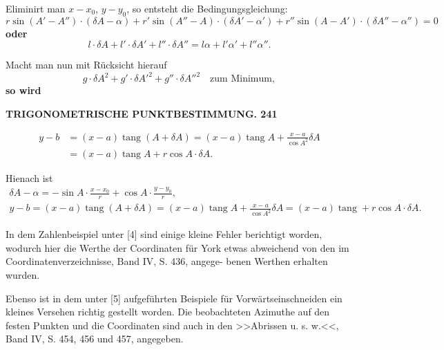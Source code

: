 \documentclass[12pt,a4paper]{article}
\theoremstyle{plain}
\theoremstyle{definition}
\theoremstyle{remark}
\DeclareMathOperator{\tang}{tang}
\begin{document}
Eliminirt man $x - x_0$, $y - y_0$, so entsteht die Bedingungsgleichung:
\[
r\sin(A' - A'') \cdot (\delta A - \alpha) + r'\sin(A'' - A) \cdot (\delta A' - \alpha') + r''\sin(A - A') \cdot (\delta A'' - \alpha'') = 0
\]
\textbf{oder}
\[
l \cdot \delta A + l' \cdot \delta A' + l'' \cdot \delta A'' = l\alpha + l'\alpha' + l''\alpha''.
\]

Macht man nun mit R\"ucksicht hierauf
\[
g \cdot \delta A^2 + g' \cdot \delta A'^2 + g'' \cdot \delta A''^2 \quad \text{zum Minimum},
\]
\textbf{so wird}


\newpage

\noindent\textbf{TRIGONOMETRISCHE PUNKTBESTIMMUNG. 241}

\begin{align*}
y - b &= (x - a)\tang(A + \delta A) = (x - a)\tang A + \frac{x - a}{\cos A^2}\delta A \\
&= (x - a)\tang A + r\cos A \cdot \delta A.
\end{align*}

Hienach ist
\begin{gather*}
\delta A - \alpha = -\sin A \cdot \frac{x - x_0}{r} + \cos A \cdot \frac{y - y_0}{r},\\
y - b = (x - a)\tang(A + \delta A) = (x - a)\tang A + \frac{x - a}{\cos A^2}\delta A = (x - a)\tang + r\cos A \cdot \delta A.
\end{gather*}

In dem Zahlenbeispiel unter [4] sind einige kleine Fehler berichtigt worden, wodurch hier die Werthe
der Coordinaten f\"ur York etwas abweichend von den im Coordinatenverzeichnisse, Band IV, S. 436, angege-
benen Werthen erhalten wurden.

Ebenso ist in dem unter [5] aufgef\"uhrten Beispiele f\"ur Vorw\"artseinschneiden ein kleines Versehen
richtig gestellt worden. Die beobachteten Azimuthe auf den festen Punkten und die Coordinaten sind
auch in den >>Abrissen u. s. w.<<, Band IV, S. 454, 456 und 457, angegeben.
\end{document}

